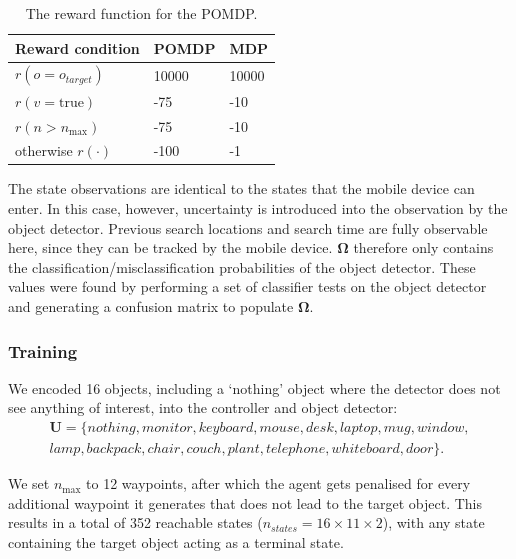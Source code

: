 \documentclass[runningheads]{llncs}
\begin{document}
\begin{table}
  \centering
  \caption{The reward function for the POMDP. }\label{tab:rewards}
  \begin{tabular}{p{3cm}p{2cm}p{2cm}}
    \toprule
    Reward condition        & POMDP  & MDP   \\ \midrule
    $r(o = o_{target})$     & 10000  & 10000 \\ 
    $r(v = \textrm{true})$  & -75    & -10   \\
    $r(n > n_{\max})$       & -75    & -10   \\
    otherwise $r(\cdot)$    & -100   & -1    \\
    \bottomrule
  \end{tabular}
\end{table}

The state observations are identical to the states that the mobile device can enter. 
In this case, however, uncertainty is introduced into the observation by the object detector.
Previous search locations and search time are fully observable here, since they can be tracked by the mobile device.
$\mathbf{\Omega}$ therefore only contains the classification/misclassification probabilities of the object detector. 
These values were found by performing a set of classifier tests on the object detector and generating a confusion matrix to populate $\mathbf{\Omega}$.

\subsubsection{Training}

We encoded 16 objects, including a `nothing' object where the detector does not see anything of interest, into the controller and object detector:
\begin{equation*}
  \begin{split}
    \mathbf{U} = \{ nothing, monitor, keyboard, mouse, desk, laptop, mug, window,\\ 
      lamp, backpack, chair, couch, plant, telephone, whiteboard, door \}.
  \end{split}
\end{equation*}

\noindent We set $n_{\max}$ to 12 waypoints, after which the agent gets penalised for every additional waypoint it generates that does not lead to the target object. 
This results in a total of 352 reachable states ($n_{states} = 16\times11\times2$), with any state containing the target object acting as a terminal state.
\end{document}
